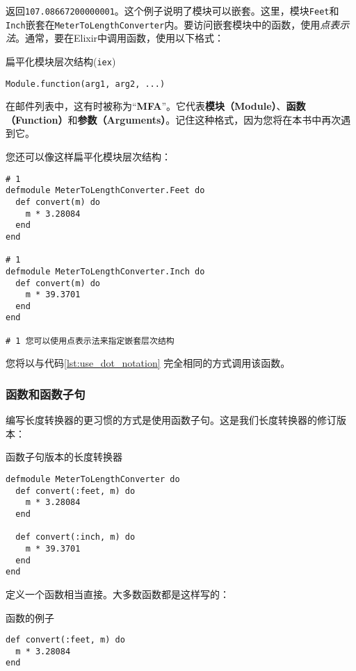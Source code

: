 返回\texttt{107.08667200000001}。这个例子说明了模块可以嵌套。这里，模块\texttt{Feet}和\texttt{Inch}嵌套在\texttt{MeterToLengthConverter}内。要访问嵌套模块中的函数，使用\emph{点表示法}。通常，要在Elixir中调用函数，使用以下格式：

\begin{code}{扁平化模块层次结构(\texttt{iex})}
\begin{verbatim}
Module.function(arg1, arg2, ...)
\end{verbatim}
\label{lst:flatten_module_hierarchy}
\end{code}

在邮件列表中，这有时被称为``\textbf{MFA}''。它代表\textbf{模块（Module）}、\textbf{函数（Function）}和\textbf{参数（Arguments）}。记住这种格式，因为您将在本书中再次遇到它。

您还可以像这样扁平化模块层次结构：

\begin{code}{}\begin{verbatim}
# 1
defmodule MeterToLengthConverter.Feet do
  def convert(m) do
    m * 3.28084
  end
end

# 1
defmodule MeterToLengthConverter.Inch do
  def convert(m) do
    m * 39.3701
  end
end

# 1 您可以使用点表示法来指定嵌套层次结构
\end{verbatim}
\end{code}


您将以与代码\ref{lst:use_dot_notation} 完全相同的方式调用该函数。


\subsubsection{函数和函数子句}

编写长度转换器的更习惯的方式是使用函数子句。这是我们长度转换器的修订版本：

\begin{code}{函数子句版本的长度转换器}
\begin{verbatim}
defmodule MeterToLengthConverter do
  def convert(:feet, m) do
    m * 3.28084
  end

  def convert(:inch, m) do
    m * 39.3701
  end
end
\end{verbatim}
\label{lst:function_clause_version_of_length_converter}
\end{code}

定义一个函数相当直接。大多数函数都是这样写的：

\begin{code}{函数的例子}
\begin{verbatim}
def convert(:feet, m) do
  m * 3.28084
end
\end{verbatim}
\label{lst:function_example}
\end{code}

